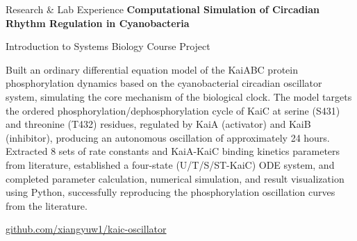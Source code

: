 \begin{rubric}{Research \& Lab Experience}
%
\entry*[Fall 2025]%
	\textbf{Computational Simulation of Circadian Rhythm Regulation in Cyanobacteria}\par
	Introduction to Systems Biology Course Project\par
	Built an ordinary differential equation model of the KaiABC protein phosphorylation dynamics based on the cyanobacterial circadian oscillator system, simulating the core mechanism of the biological clock. The model targets the ordered phosphorylation/dephosphorylation cycle of KaiC at serine (S431) and threonine (T432) residues, regulated by KaiA (activator) and KaiB (inhibitor), producing an autonomous oscillation of approximately 24 hours. Extracted 8 sets of rate constants and KaiA-KaiC binding kinetics parameters from literature, established a four-state (U/T/S/ST-KaiC) ODE system, and completed parameter calculation, numerical simulation, and result visualization using Python, successfully reproducing the phosphorylation oscillation curves from the literature.\par
	\href{https://github.com/xiangyuw1/kaic-oscillator}{github.com/xiangyuw1/kaic-oscillator}
%
\end{rubric}
